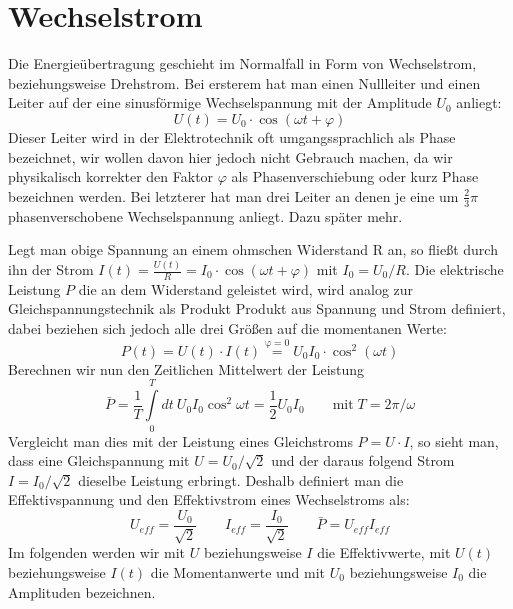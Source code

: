
\section{Wechselstrom}
Die Energieübertragung geschieht im Normalfall in Form von Wechselstrom, beziehungsweise Drehstrom. %
Bei ersterem hat man einen Nullleiter und einen Leiter auf der eine sinusförmige Wechselspannung mit der Amplitude $U_0$ anliegt:
\begin{equation}
U(t)=U_0 \cdot \cos(\omega t + \varphi)
\end{equation}
Dieser Leiter wird in der Elektrotechnik oft umgangssprachlich als Phase bezeichnet, wir wollen davon hier jedoch nicht Gebrauch machen, da wir physikalisch korrekter den Faktor $\varphi$ als Phasenverschiebung oder kurz Phase bezeichnen werden.
Bei letzterer hat man drei Leiter an denen je eine um $\frac23\pi$ phasenverschobene Wechselspannung anliegt. Dazu später mehr. %

Legt man obige Spannung an einem ohmschen Widerstand R an, so fließt durch ihn der Strom $I(t)= \frac{U(t)}{R} = I_0 \cdot \cos(\omega t + \varphi)$ mit $I_0 = U_0/R$.
Die elektrische Leistung $P$ die an dem Widerstand geleistet wird, wird analog zur Gleichspannungstechnik als Produkt Produkt aus Spannung und Strom definiert, dabei beziehen sich jedoch alle drei Größen auf die momentanen Werte:
\begin{equation}
P(t) = U(t) \cdot I(t) \stackrel{\mathrm{\varphi=0}}= U_0 I_0 \cdot \cos^2(\omega t)
\end{equation}
Berechnen wir nun den Zeitlichen Mittelwert der Leistung
\begin{equation}
\bar{P}=\frac1T \int\limits_0^T dt\: U_0 I_0 \cos^2 \omega t = \frac12 U_0 I_0 \qquad\mathrm{mit}\; T=2\pi/\omega
\end{equation}
Vergleicht man dies mit der Leistung eines Gleichstroms $P=U\cdot I$, so sieht man, dass eine Gleichspannung mit $U=U_0 / \sqrt2$ und der daraus folgend Strom $I=I_0 / \sqrt2$ dieselbe Leistung erbringt.
Deshalb definiert man die Effektivspannung und den Effektivstrom eines Wechselstroms als:
\begin{equation*}
U_{eff} = \frac{U_0}{\sqrt2} \qquad I_{eff} = \frac{I_0}{\sqrt2} \qquad \bar{P}=U_{eff}I_{eff}
\end{equation*}
Im folgenden werden wir mit $U$ beziehungsweise $I$ die Effektivwerte, mit $U(t)$ beziehungsweise $I(t)$ die Momentanwerte und mit $U_0$ beziehungsweise $I_0$ die Amplituden bezeichnen.


